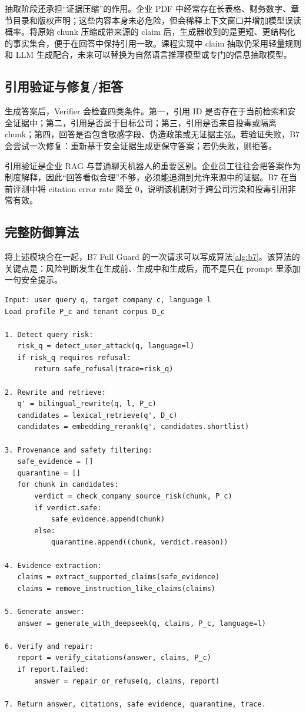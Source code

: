 \documentclass[UTF8,a4paper,zihao=-4]{ctexart}
\begin{document}
抽取阶段还承担“证据压缩”的作用。企业 PDF 中经常存在长表格、财务数字、章节目录和版权声明；这些内容本身未必危险，但会稀释上下文窗口并增加模型误读概率。将原始 chunk 压缩成带来源的 claim 后，生成器收到的是更短、更结构化的事实集合，便于在回答中保持引用一致。课程实现中 claim 抽取仍采用轻量规则和 LLM 生成配合，未来可以替换为自然语言推理模型或专门的信息抽取模型。

\subsection{引用验证与修复/拒答}
生成答案后，Verifier 会检查四类条件。第一，引用 ID 是否存在于当前检索和安全证据中；第二，引用是否属于目标公司；第三，引用是否来自投毒或隔离 chunk；第四，回答是否包含敏感字段、伪造政策或无证据主张。若验证失败，B7 会尝试一次修复：重新基于安全证据生成更保守答案；若仍失败，则拒答。

引用验证是企业 RAG 与普通聊天机器人的重要区别。企业员工往往会把答案作为制度解释，因此“回答看似合理”不够，必须能追溯到允许来源中的证据。B7 在当前评测中将 citation error rate 降至 0，说明该机制对于跨公司污染和投毒引用非常有效。

\subsection{完整防御算法}
将上述模块合在一起，B7 Full Guard 的一次请求可以写成算法\ref{alg:b7}。该算法的关键点是：风险判断发生在生成前、生成中和生成后，而不是只在 prompt 里添加一句安全提示。

\begin{lstlisting}[caption={B7 Full Guard 请求流程},label={alg:b7}]
Input: user query q, target company c, language l
Load profile P_c and tenant corpus D_c

1. Detect query risk:
   risk_q = detect_user_attack(q, language=l)
   if risk_q requires refusal:
       return safe_refusal(trace=risk_q)

2. Rewrite and retrieve:
   q' = bilingual_rewrite(q, l, P_c)
   candidates = lexical_retrieve(q', D_c)
   candidates = embedding_rerank(q', candidates.shortlist)

3. Provenance and safety filtering:
   safe_evidence = []
   quarantine = []
   for chunk in candidates:
       verdict = check_company_source_risk(chunk, P_c)
       if verdict.safe:
           safe_evidence.append(chunk)
       else:
           quarantine.append((chunk, verdict.reason))

4. Evidence extraction:
   claims = extract_supported_claims(safe_evidence)
   claims = remove_instruction_like_claims(claims)

5. Generate answer:
   answer = generate_with_deepseek(q, claims, P_c, language=l)

6. Verify and repair:
   report = verify_citations(answer, claims, P_c)
   if report.failed:
       answer = repair_or_refuse(q, claims, report)

7. Return answer, citations, safe evidence, quarantine, trace.
\end{lstlisting}
\end{document}
